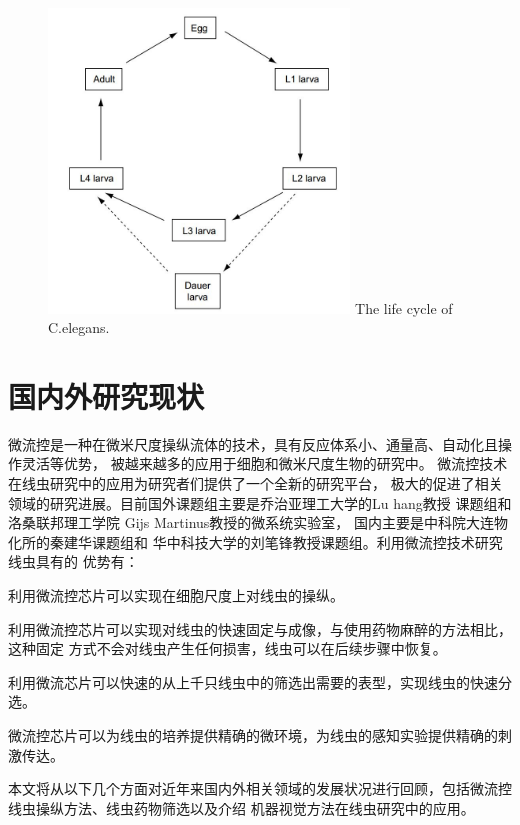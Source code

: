 	\begin{figure}[h]
	  \centering
	  \includegraphics[width=8cm]{figure/chap1/lifecycle.jpg}
		{The life cycle of C.elegans.}
	  \label{fig:lifecycle}
	\end{figure}
	
\section{国内外研究现状}
\label{sec:intro:analog}
	微流控是一种在微米尺度操纵流体的技术，具有反应体系小、通量高、自动化且操作灵活等优势，
	被越来越多的应用于细胞和微米尺度生物的研究中。
	微流控技术在线虫研究中的应用为研究者们提供了一个全新的研究平台，
	极大的促进了相关领域的研究进展。目前国外课题组主要是乔治亚理工大学的Lu hang教授
	课题组和洛桑联邦理工学院
	Gijs Martinus教授的微系统实验室，
	国内主要是中科院大连物化所的秦建华课题组和
	华中科技大学的刘笔锋教授课题组。利用微流控技术研究线虫具有的
	优势有：\begin{enumerate*}[label=\arabic*.]
	\item 利用微流控芯片可以实现在细胞尺度上对线虫的操纵。\quad
	\item 利用微流控芯片可以实现对线虫的快速固定与成像，与使用药物麻醉的方法相比，这种固定
		方式不会对线虫产生任何损害，线虫可以在后续步骤中恢复。\quad
	\item 利用微流芯片可以快速的从上千只线虫中的筛选出需要的表型，实现线虫的快速分选。\quad
	\item 微流控芯片可以为线虫的培养提供精确的微环境，为线虫的感知实验提供精确的刺激传达。\quad
\end{enumerate*}
	本文将从以下几个方面对近年来国内外相关领域的发展状况进行回顾，包括微流控线虫操纵方法、线虫药物筛选以及介绍
	机器视觉方法在线虫研究中的应用。
